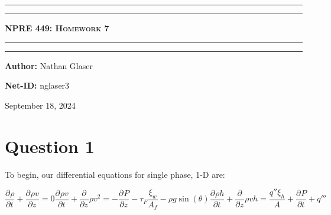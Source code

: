 \documentclass{article}
\begin{document}
\newcommand{\circled}[1]{\tikz[baseline=(char.base)]{
            \node[shape=circle,draw,inner sep=2pt] (char) {#1};}}

\newcommand{\pd}[3]{\frac{\partial^{#3}#1}{\partial {#2}^{#3}}}
\begin{titlepage}

\centering
\scshape
\vspace{\baselineskip}

%
\rule{\textwidth}{1.6pt}\vspace*{-\baselineskip}\vspace*{2pt}
\rule{\textwidth}{0.4pt}

{\Huge \textbf{\textsc{NPRE 449: Homework 7 \\
\vspace{15pt}}}}

\rule{\textwidth}{0.4pt}\vspace*{-\baselineskip}\vspace{3.2pt}
\rule{\textwidth}{1.6pt}\vspace{6pt}
\vspace{1.5\baselineskip}


\large \centerline{\textbf{Author:} Nathan Glaser}
\large \centerline{\textbf{Net-ID:} nglaser3}
\quad

\vfill
\large \centerline{September 18, 2024}
%
\end{titlepage}

\tableofcontents
\newpage
{}

\section{Question 1}
To begin, our differential equations for single phase, 1-D are:

\begin{subequations}
    \begin{equation}
        \pd{\rho}{t}{} + \pd{\rho v}{z}{} = 0
        \label{mass}
    \end{equation}
    \begin{equation}
        \pd{\rho v}{t}{} + \pd{}{z}{}\rho v^2 = -\pd{P}{z}{}-\tau_F\frac{\xi_w}{A_f} - \rho g \sin(\theta)
        \label{momentum}
    \end{equation}
    \begin{equation}
        \pd{\rho h}{t}{} + \pd{}{z}{}\rho v h = \frac{q''\xi_h}{A}+\pd{P}{t}{} + q'''
        \label{energy}
    \end{equation}
\end{subequations}
\end{document}
